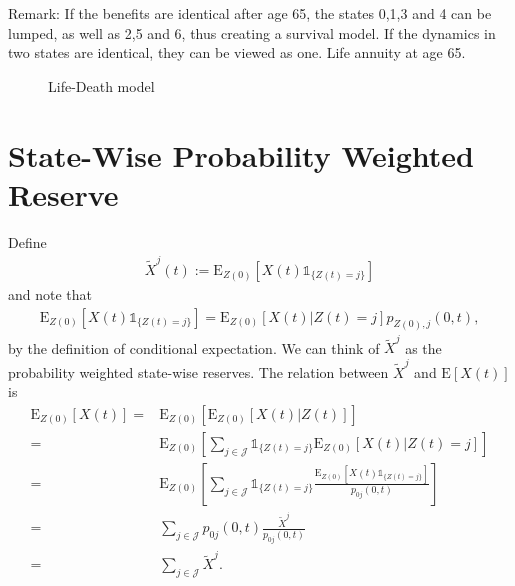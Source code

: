 \documentclass[12pt]{article}
\newcommand{\E}{\text{E}}
\newcommand{\indic}[1]{\mathds{1}_{ \{ #1 \} }}
\begin{document}
Remark: If the benefits are identical after age 65, the states 0,1,3 and 4 can be lumped, as well as 2,5 and 6, thus creating a survival model. If the dynamics in two states are identical, they can be viewed as one. Life annuity at age 65.


\def\PlA{(0,0)}
\begin{figure}[H]
\begin{center}
\label{fig:1}
\caption{Life-Death model}
\end{center}
\end{figure}



\section*{State-Wise Probability Weighted Reserve}
Define
\begin{align*}
\tilde{X}^j(t):=\E_{Z(0)}[X(t)\indic{Z(t)=j}]
\end{align*}
and note that
\begin{align}
\E_{Z(0)}[X(t)\indic{Z(t)=j}]= \E_{Z(0)}[X(t)|Z(t)=j]p_{Z(0),j}(0,t), \label{eq:1}
\end{align}
by the definition of conditional expectation. We can think of $\tilde{X}^j$ as the probability weighted state-wise reserves. The relation between $\tilde{X}^j$ and $\E[X(t)]$ is
\begin{align*}
\E_{Z(0)}[X(t)] =& \E_{Z(0)}[\E_{Z(0)} [ X(t)|Z(t)]] 
\\
=&
\E_{Z(0)} \left[ \sum_{j\in \mathcal{J}} \indic{Z(t)=j} \E_{Z(0)} [ X(t)|Z(t)=j] \right]
\\
=&
\E_{Z(0)} \left[ \sum_{j\in \mathcal{J}} \indic{Z(t)=j} \frac{\E_{Z(0)}[X(t)\indic{Z(t)=j}]}{p_{0j}(0,t)} \right]
\\
=&
\sum_{j\in \mathcal{J}} p_{0j}(0,t) \frac{ \tilde{X}^j}{p_{0j}(0,t)}
\\
=&
\sum_{j\in \mathcal{J}} \tilde{X}^j.
\end{align*}
\end{document}

